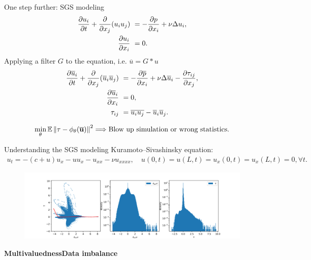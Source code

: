 \documentclass[aspectratio=169]{beamer}
\begin{document}
\begin{frame}{One step further: SGS modeling}
	\begin{equation*}
		\begin{aligned}
		\frac{\partial u_i}{\partial t} + \frac{\partial}{\partial x_j}(u_iu_j) & \ = 
		-\frac{\partial p}{\partial x_i} + \nu\Delta u_i,   \\
		\frac{\partial u_i}{\partial x_i} & \ = 0.
		\end{aligned}
	\end{equation*}
	Applying a filter $G$ to the equation, i.e. 
	$\overline{u} = G * u$
	\begin{equation*}
		\begin{aligned}
		\frac{\partial \overline{u}_i}{\partial t} + \frac{\partial}{\partial x_j}(\overline{u}_i
		\overline{u}_j) & \ = -\frac{\partial \overline{p}}{\partial x_i} + \nu\Delta 
		\overline{u}_i - \frac{\partial \tau_{ij}}{\partial x_j},   \\
		\frac{\partial \overline{u}_i}{\partial x_i} & \ = 0,		\\
		\tau_{ij} & \ = \overline{u_iu_j} - \overline{u}_i\overline{u}_j.
		\end{aligned}
	\end{equation*}
	
	{\color{red}
	\begin{equation*}
		\min_{\theta} \mathbb{E} \left\| \tau - \phi_{\theta}(\overline{\mathbf{u}}) \right\|^2 \Longrightarrow
		\text{Blow up simulation or wrong statistics.}
	\end{equation*}}
\end{frame}

\begin{frame}{Understanding the SGS modeling}
	Kuramoto–Sivashinsky equation:
	\begin{equation*}
		\begin{aligned}
			u_t = -(c + u)u_x - uu_x - u_{xx} - \nu u_{xxxx}, \quad u(0, t) = u(L, t) = 
			u_x(0, t) = u_x(L, t) = 0, \forall t.
		\end{aligned}
	\end{equation*}
	\begin{figure}[ht]
     \centering 
     \includegraphics[width=\textwidth]
     {fig/ks_hist.png} 
\end{figure}
\hspace{2cm}\textbf{Multivaluedness}\hspace{3cm}\textbf{Data imbalance}
\end{frame}
\end{document}

